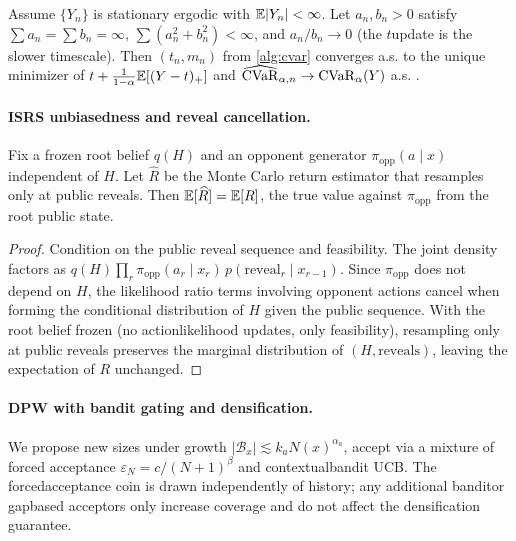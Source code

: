 \begin{proposition}\label{prop:sa}
Assume $\{Y_n\}$ is stationary ergodic with $\mathbb{E}|Y_n|<\infty$. Let $a_n,b_n>0$ satisfy $\sum a_n=\sum b_n=\infty$, $\sum (a_n^2+b_n^2)<\infty$, and $a_n/b_n\to 0$ (the $t$\textendash update is the slower timescale). Then $(t_n,m_n)$ from \cref{alg:cvar} converges a.s. to the unique minimizer of $t+\frac{1}{1-\alpha}\mathbb{E}[(Y-t)_+]$ and $\widehat{\mathrm{CVaR}}_{\alpha,n}\to \mathrm{CVaR}_\alpha(Y)$ a.s. \cite{rockafellar2000cvar,borkar2008sa}.
\end{proposition}

\paragraph{IS\textendash RS unbiasedness and reveal cancellation.}
\begin{lemma}\label{lem:isrs}
Fix a frozen root belief $q(H)$ and an opponent generator $\pi_{\mathrm{opp}}(a\mid x)$ independent of $H$. Let $\widehat{R}$ be the Monte Carlo return estimator that resamples only at public reveals. Then $\mathbb{E}[\widehat{R}]=\mathbb{E}[R]$, the true value against $\pi_{\mathrm{opp}}$ from the root public state.
\end{lemma}
\begin{proof}
Condition on the public reveal sequence and feasibility. The joint density factors as $q(H)\prod_r \pi_{\mathrm{opp}}(a_r\mid x_r)\,p(\mathrm{reveal}_r\mid x_{r-1})$. Since $\pi_{\mathrm{opp}}$ does not depend on $H$, the likelihood ratio terms involving opponent actions cancel when forming the conditional distribution of $H$ given the public sequence. With the root belief frozen (no action\textendash likelihood updates, only feasibility), resampling only at public reveals preserves the marginal distribution of $(H,\mathrm{reveals})$, leaving the expectation of $R$ unchanged.
\end{proof}

\paragraph{DPW with bandit gating and densification.}
We propose new sizes under growth $|\mathcal{B}_x|\lesssim k_a N(x)^{\alpha_a}$, accept via a mixture of forced acceptance $\varepsilon_N=c/(N+1)^\beta$ and contextual\textendash bandit UCB. The forced\textendash acceptance coin is drawn independently of history; any additional bandit\textendash or gap\textendash based acceptors only increase coverage and do not affect the densification guarantee.

